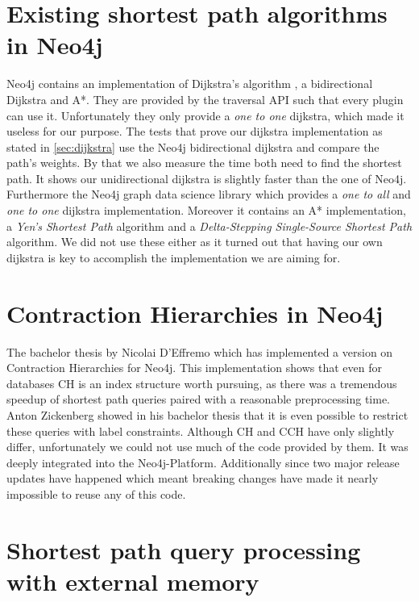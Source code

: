 \section{Existing shortest path algorithms in Neo4j}

Neo4j contains an implementation of Dijkstra's algorithm , a bidirectional Dijkstra and A*.
They are provided by the traversal API such that every plugin can use it.
Unfortunately they only provide a \textit{one to one} dijkstra, which made it useless for our purpose.
The tests that prove our dijkstra implementation as stated in \ref{sec:dijkstra} use the Neo4j bidirectional dijkstra and compare the path's weights.
By that we also measure the time both need to find the shortest path.
It shows our unidirectional dijkstra is slightly faster than the one of Neo4j.
\\
Furthermore the Neo4j graph data science library  which provides a \textit{one to all} and \textit{one to one} dijkstra implementation.
Moreover it contains an A* implementation, a \textit{Yen’s Shortest Path} algorithm and a \textit{Delta-Stepping Single-Source Shortest Path} algorithm.
We did not use these either as it turned out that having our own dijkstra is key to accomplish the implementation we are aiming for.

\section{Contraction Hierarchies in Neo4j}\label{sec:related_work:database}

The bachelor thesis by Nicolai D'Effremo \cite{DEffremo2019} which has implemented a version on Contraction Hierarchies \cite{Geisberger_2012} for Neo4j.
This implementation shows that even for databases CH is an index structure worth pursuing, as there was a tremendous speedup of shortest path queries paired with a reasonable preprocessing time.
Anton Zickenberg \cite{Zickenberg2021} showed in his bachelor thesis that it is even possible to restrict these queries with label constraints.
Although CH and CCH have only slightly differ, unfortunately we could not use much of the code provided by them.
It was deeply integrated into the Neo4j-Platform.
Additionally since two major release updates have happened which meant breaking changes have made it nearly impossible to reuse any of this code.

\section{Shortest path query processing with external memory}

